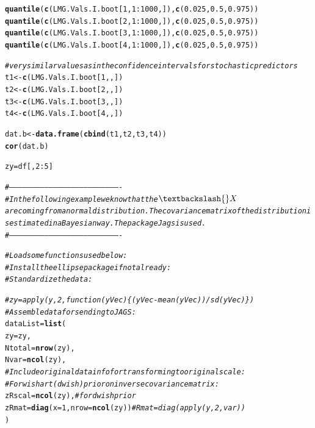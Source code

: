\documentclass[11pt,a4paper,twoside]{book}\usepackage[]{graphicx}\usepackage[]{color}
\makeatletter
\newcommand{\hlnum}[1]{\textcolor[rgb]{0.686,0.059,0.569}{#1}}%
\newcommand{\hlcom}[1]{\textcolor[rgb]{0.678,0.584,0.686}{\textit{#1}}}%
\newcommand{\hlopt}[1]{\textcolor[rgb]{0,0,0}{#1}}%
\newcommand{\hlstd}[1]{\textcolor[rgb]{0.345,0.345,0.345}{#1}}%
\newcommand{\hlkwb}[1]{\textcolor[rgb]{0.69,0.353,0.396}{#1}}%
\newcommand{\hlkwc}[1]{\textcolor[rgb]{0.333,0.667,0.333}{#1}}%
\newcommand{\hlkwd}[1]{\textcolor[rgb]{0.737,0.353,0.396}{\textbf{#1}}}%
\newenvironment{kframe}{%
 \def\at@end@of@kframe{}%
 \ifinner\ifhmode%
  \def\at@end@of@kframe{\end{minipage}}%
  \begin{minipage}{\columnwidth}%
 \fi\fi%
 \def\FrameCommand##1{\hskip\@totalleftmargin \hskip-\fboxsep
 \colorbox{shadecolor}{##1}\hskip-\fboxsep
     \hskip-\linewidth \hskip-\@totalleftmargin \hskip\columnwidth}%
 \MakeFramed {\advance\hsize-\width
   \@totalleftmargin\z@ \linewidth\hsize
   \@setminipage}}%
 {\par\unskip\endMakeFramed%
 \at@end@of@kframe}
\newenvironment{knitrout}{}{} %
\makeatother
\begin{document}
\begin{knitrout}
\begin{kframe}
\begin{alltt}
\hlkwd{quantile}\hlstd{(}\hlkwd{c}\hlstd{(LMG.Vals.I.boot[}\hlnum{1}\hlstd{,}\hlnum{1}\hlopt{:}\hlnum{1000}\hlstd{,]),} \hlkwd{c}\hlstd{(}\hlnum{0.025}\hlstd{,} \hlnum{0.5}\hlstd{,} \hlnum{0.975}\hlstd{))}
\hlkwd{quantile}\hlstd{(}\hlkwd{c}\hlstd{(LMG.Vals.I.boot[}\hlnum{2}\hlstd{,}\hlnum{1}\hlopt{:}\hlnum{1000}\hlstd{,]),} \hlkwd{c}\hlstd{(}\hlnum{0.025}\hlstd{,} \hlnum{0.5}\hlstd{,} \hlnum{0.975}\hlstd{))}
\hlkwd{quantile}\hlstd{(}\hlkwd{c}\hlstd{(LMG.Vals.I.boot[}\hlnum{3}\hlstd{,}\hlnum{1}\hlopt{:}\hlnum{1000}\hlstd{,]),} \hlkwd{c}\hlstd{(}\hlnum{0.025}\hlstd{,} \hlnum{0.5}\hlstd{,} \hlnum{0.975}\hlstd{))}
\hlkwd{quantile}\hlstd{(}\hlkwd{c}\hlstd{(LMG.Vals.I.boot[}\hlnum{4}\hlstd{,}\hlnum{1}\hlopt{:}\hlnum{1000}\hlstd{,]),} \hlkwd{c}\hlstd{(}\hlnum{0.025}\hlstd{,} \hlnum{0.5}\hlstd{,} \hlnum{0.975}\hlstd{))}

\hlcom{#very similar values as in the confidence intervals for stochastic predictors}
\hlstd{t1} \hlkwb{<-} \hlkwd{c}\hlstd{(LMG.Vals.I.boot[}\hlnum{1}\hlstd{,,])}
\hlstd{t2} \hlkwb{<-} \hlkwd{c}\hlstd{(LMG.Vals.I.boot[}\hlnum{2}\hlstd{,,])}
\hlstd{t3} \hlkwb{<-} \hlkwd{c}\hlstd{(LMG.Vals.I.boot[}\hlnum{3}\hlstd{,,])}
\hlstd{t4} \hlkwb{<-} \hlkwd{c}\hlstd{(LMG.Vals.I.boot[}\hlnum{4}\hlstd{,,])}

\hlstd{dat.b}\hlkwb{<-}\hlkwd{data.frame}\hlstd{(}\hlkwd{cbind}\hlstd{(t1,t2,t3,t4))}
\hlkwd{cor}\hlstd{(dat.b)}



\hlstd{zy} \hlkwb{=} \hlstd{df[,}\hlnum{2}\hlopt{:}\hlnum{5}\hlstd{]}

\hlcom{#----------------------------------------------------------------------------}
\hlcom{# In the following example we know that the $\textbackslash{}X$ are coming from a normal distribution. The covariance matrix of the distribution is estimated in aBayesian way. The package Jags is used.}
\hlcom{#----------------------------------------------------------------------------}

\hlcom{# Load some functions used below:}
\hlcom{# Install the ellipse package if not already:}
\hlcom{# Standardize the data:}

\hlcom{#zy = apply(y,2,function(yVec)\{(yVec-mean(yVec))/sd(yVec)\})}
\hlcom{# Assemble data for sending to JAGS:}
\hlstd{dataList} \hlkwb{=} \hlkwd{list}\hlstd{(}
        \hlkwc{zy} \hlstd{= zy ,}
        \hlkwc{Ntotal} \hlstd{=}  \hlkwd{nrow}\hlstd{(zy) ,}
        \hlkwc{Nvar} \hlstd{=} \hlkwd{ncol}\hlstd{(zy) ,}
        \hlcom{# Include original data info for transforming to original scale:}
        \hlcom{# For wishart (dwish) prior on inverse covariance matrix:}
        \hlkwc{zRscal} \hlstd{=} \hlkwd{ncol}\hlstd{(zy) ,}  \hlcom{# for dwish prior}
        \hlkwc{zRmat} \hlstd{=} \hlkwd{diag}\hlstd{(}\hlkwc{x}\hlstd{=}\hlnum{1}\hlstd{,}\hlkwc{nrow}\hlstd{=}\hlkwd{ncol}\hlstd{(zy))}  \hlcom{# Rmat = diag(apply(y,2,var))}
\hlstd{)}


\end{alltt}
\end{kframe}
\end{knitrout}
\end{document}
